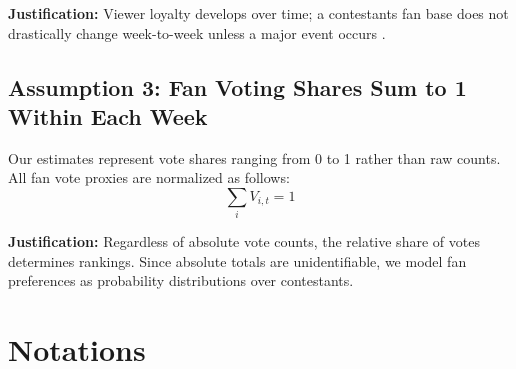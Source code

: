 \documentclass{mcmthesis}
\begin{document}
\textbf{Justification:} Viewer loyalty develops over time; a contestants fan base does not drastically change week-to-week unless a major event occurs .

\subsection*{Assumption 3: Fan Voting Shares Sum to 1 Within Each Week}
Our estimates represent vote shares ranging from 0 to 1 rather than raw counts. All fan vote proxies are normalized as follows:
\begin{equation}
\sum_{i} V_{i,t} = 1 
\end{equation}

\textbf{Justification:} Regardless of absolute vote counts, the relative share of votes determines rankings. Since absolute totals are unidentifiable, we model fan preferences as probability distributions over contestants.


\section{Notations}
\end{document}
